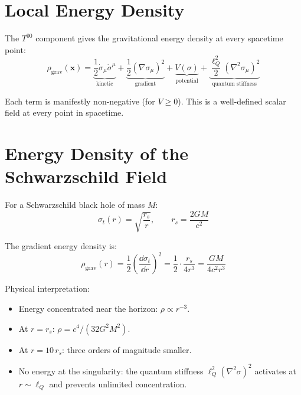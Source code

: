 \documentclass[11pt,a4paper]{article}
\theoremstyle{plain}
\theoremstyle{definition}
\theoremstyle{remark}
\newcommand{\lQ}{\ell_Q}
\begin{document}
\section{Local Energy Density}
\label{sec:density}

The $T^{00}$ component gives the gravitational energy density at every spacetime point:
\begin{equation}
  \boxed{\rho_{\mathrm{grav}}(\mathbf{x}) = \underbrace{\frac{1}{2}\dot\sigma_\mu\dot\sigma^\mu}_{\text{kinetic}} + \underbrace{\frac{1}{2}(\nabla\sigma_\mu)^2}_{\text{gradient}} + \underbrace{V(\sigma)}_{\text{potential}} + \underbrace{\frac{\lQ^2}{2}(\nabla^2\sigma_\mu)^2}_{\text{quantum stiffness}}}
  \label{eq:rho}
\end{equation}

Each term is manifestly non-negative (for $V \geq 0$).  This is a well-defined scalar field at every point in spacetime.

\section{Energy Density of the Schwarzschild Field}
\label{sec:schwarzschild}

For a Schwarzschild black hole of mass $M$:
\begin{equation}
  \sigma_t(r) = \sqrt{\frac{r_s}{r}}, \qquad r_s = \frac{2GM}{c^2}
\end{equation}

The gradient energy density is:
\begin{equation}
  \rho_{\mathrm{grav}}(r) = \frac{1}{2}\!\left(\frac{\dd\sigma_t}{\dd r}\right)^{\!2} = \frac{1}{2}\cdot\frac{r_s}{4r^3} = \boxed{\frac{GM}{4c^2 r^3}}
  \label{eq:rho_schw}
\end{equation}

Physical interpretation:
\begin{itemize}
  \item Energy concentrated near the horizon: $\rho \propto r^{-3}$.
  \item At $r = r_s$: $\rho = c^4/(32G^2M^2)$.
  \item At $r = 10\,r_s$: three orders of magnitude smaller.
  \item No energy at the singularity: the quantum stiffness $\lQ^2(\nabla^2\sigma)^2$ activates at $r \sim \lQ$ and prevents unlimited concentration.
\end{itemize}
\end{document}
